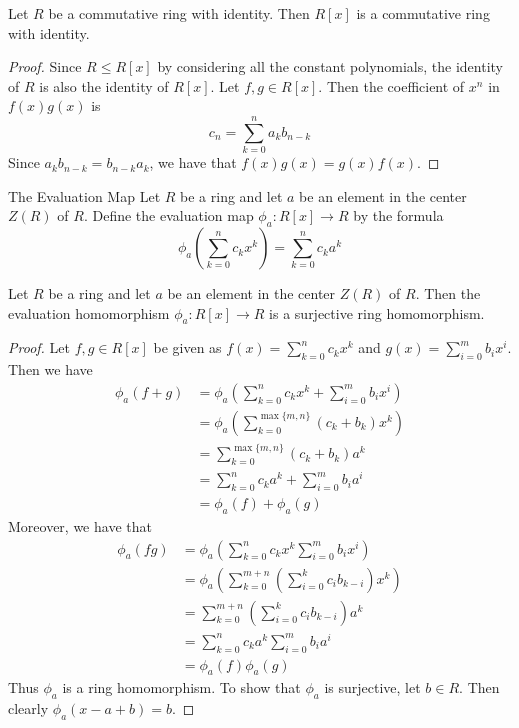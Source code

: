 \documentclass[a4paper]{article}
\begin{document}
\begin{prp}{}{} Let $R$ be a commutative ring with identity. Then $R[x]$ is a commutative ring with identity. \tcbline
\begin{proof}
Since $R\leq R[x]$ by considering all the constant polynomials, the identity of $R$ is also the identity of $R[x]$. Let $f,g\in R[x]$. Then the coefficient of $x^n$ in $f(x)g(x)$ is $$c_n=\sum_{k=0}^na_kb_{n-k}$$ Since $a_kb_{n-k}=b_{n-k}a_k$, we have that $f(x)g(x)=g(x)f(x)$. 
\end{proof}
\end{prp}

\begin{defn}{The Evaluation Map}{} Let $R$ be a ring and let $a$ be an element in the center $Z(R)$ of $R$. Define the evaluation map $\phi_a:R[x]\to R$ by the formula $$\phi_a\left(\sum_{k=0}^nc_kx^k\right)=\sum_{k=0}^nc_ka^k$$
\end{defn}

\begin{prp}{}{} Let $R$ be a ring and let $a$ be an element in the center $Z(R)$ of $R$. Then the evaluation homomorphism $\phi_a:R[x]\to R$ is a surjective ring homomorphism. \tcbline
\begin{proof}
Let $f,g\in R[x]$ be given as $f(x)=\sum_{k=0}^nc_kx^k$ and $g(x)=\sum_{i=0}^mb_ix^i$. Then we have 
\begin{align*}
\phi_a(f+g)&=\phi_a\left(\sum_{k=0}^nc_kx^k+\sum_{i=0}^mb_ix^i\right)\\
&=\phi_a\left(\sum_{k=0}^{\max\{m,n\}}(c_k+b_k)x^k\right)\\
&=\sum_{k=0}^{\max\{m,n\}}(c_k+b_k)a^k\\
&=\sum_{k=0}^nc_ka^k+\sum_{i=0}^mb_ia^i\\
&=\phi_a(f)+\phi_a(g)
\end{align*}
Moreover, we have that 
\begin{align*}
\phi_a(fg)&=\phi_a\left(\sum_{k=0}^nc_kx^k\sum_{i=0}^mb_ix^i\right)\\
&=\phi_a\left(\sum_{k=0}^{m+n}\left(\sum_{i=0}^kc_ib_{k-i}\right)x^k\right)\\
&=\sum_{k=0}^{m+n}\left(\sum_{i=0}^kc_ib_{k-i}\right)a^k\\
&=\sum_{k=0}^nc_ka^k\sum_{i=0}^mb_ia^i\tag{$a\in Z(R)$}\\
&=\phi_a(f)\phi_a(g)
\end{align*}
Thus $\phi_a$ is a ring homomorphism. To show that $\phi_a$ is surjective, let $b\in R$. Then clearly $\phi_a(x-a+b)=b$. 
\end{proof}
\end{prp}
\end{document}
